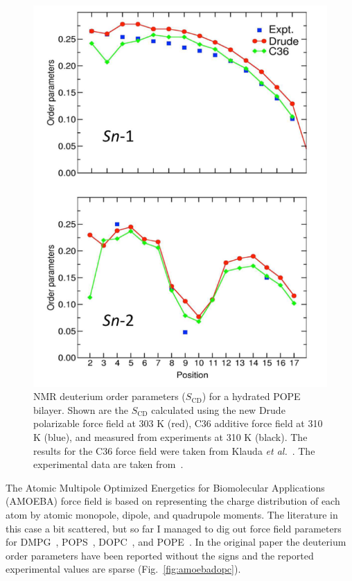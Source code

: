\documentclass[journal=jpcbfk,manuscript=article,layout=twocolumn]{achemso}
\begin{document}
\begin{figure}[!hbt]
	\centering
	\includegraphics[width=\columnwidth]{../Figures/pope_order_parameters_drude.png}
	\caption{NMR deuterium order parameters ($S_\mathrm{CD}$) for a hydrated POPE bilayer. Shown are the $S_\mathrm{CD}$ calculated using the new Drude
		polarizable force field at 303 K (red), C36 additive force field at 310 K
		(blue), and measured from experiments at 310 K (black). The results for the C36 force field were taken from Klauda \textit{et al.}~\cite{klauda2010update}. The experimental data are taken from~\cite{shaikh2002monounsaturated,perly1985acyl}.}
	\label{fig:drudepope}
	\end{figure}
			
The Atomic Multipole Optimized Energetics for Biomolecular Applications (AMOEBA)
force field is based on representing the charge distribution of each atom by
atomic monopole, dipole, and quadrupole moments. The literature in this case a
bit scattered, but so far I managed to dig out force field parameters for DMPG~\cite{chu2018anionicpolarizable},
POPS~\cite{chu2018anionicpolarizable}, DOPC~\cite{chu2018polarizable}, and POPE~\cite{chu2018polarizable}. In the original paper the deuterium order
parameters have been reported without the signs and the reported experimental
values are sparse (Fig.~\ref{fig:amoebadopc}).
\end{document}
